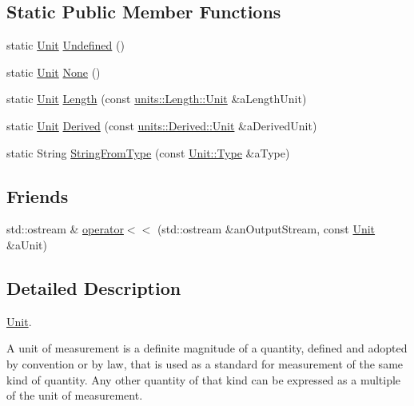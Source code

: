 \subsection*{Static Public Member Functions}
\begin{DoxyCompactItemize}
\item 
static \hyperlink{classlibrary_1_1physics_1_1_unit}{Unit} \hyperlink{classlibrary_1_1physics_1_1_unit_a9fb6d8c10aefa9a13cff18cf6d6e5733}{Undefined} ()
\item 
static \hyperlink{classlibrary_1_1physics_1_1_unit}{Unit} \hyperlink{classlibrary_1_1physics_1_1_unit_ab25dd57cb71168898324ac78b43374ac}{None} ()
\item 
static \hyperlink{classlibrary_1_1physics_1_1_unit}{Unit} \hyperlink{classlibrary_1_1physics_1_1_unit_aa7402b752586ccd442d56cf340ee9c7a}{Length} (const \hyperlink{classlibrary_1_1physics_1_1units_1_1_length_a3b8b39cd245cf6b19dc34459baeccb18}{units\+::\+Length\+::\+Unit} \&a\+Length\+Unit)
\item 
static \hyperlink{classlibrary_1_1physics_1_1_unit}{Unit} \hyperlink{classlibrary_1_1physics_1_1_unit_a2b464827a8e97a59405197d08631d3f3}{Derived} (const \hyperlink{classlibrary_1_1physics_1_1units_1_1_derived_1_1_unit}{units\+::\+Derived\+::\+Unit} \&a\+Derived\+Unit)
\item 
static String \hyperlink{classlibrary_1_1physics_1_1_unit_a97162c115f15f4eb2221dd65f36cd128}{String\+From\+Type} (const \hyperlink{classlibrary_1_1physics_1_1_unit_ab01b0024991fd80f3e5ef7c8282fccc1}{Unit\+::\+Type} \&a\+Type)
\end{DoxyCompactItemize}
\subsection*{Friends}
\begin{DoxyCompactItemize}
\item 
std\+::ostream \& \hyperlink{classlibrary_1_1physics_1_1_unit_a70630a82d569152709a999efabdb3e4f}{operator$<$$<$} (std\+::ostream \&an\+Output\+Stream, const \hyperlink{classlibrary_1_1physics_1_1_unit}{Unit} \&a\+Unit)
\end{DoxyCompactItemize}


\subsection{Detailed Description}
\hyperlink{classlibrary_1_1physics_1_1_unit}{Unit}. 

A unit of measurement is a definite magnitude of a quantity, defined and adopted by convention or by law, that is used as a standard for measurement of the same kind of quantity. Any other quantity of that kind can be expressed as a multiple of the unit of measurement.

